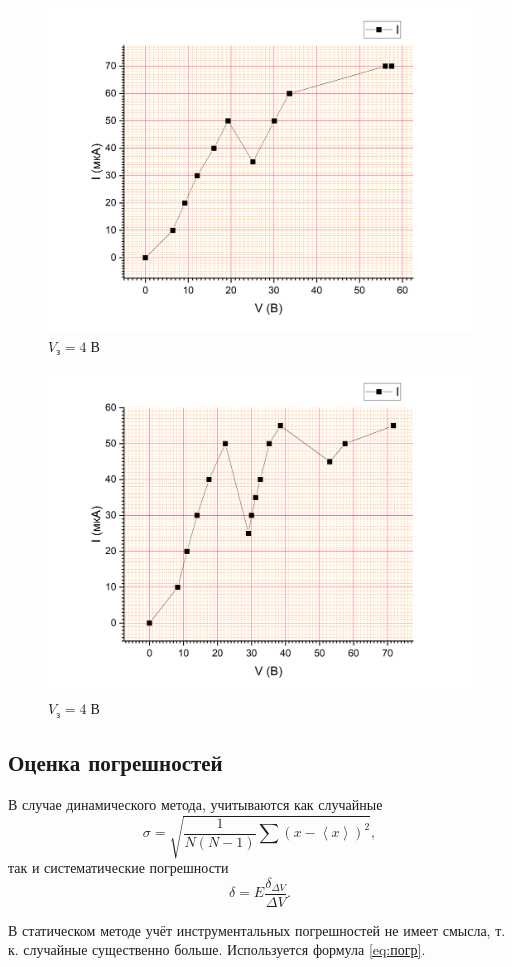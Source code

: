 \documentclass[a4paper]{article}
\begin{document}
\begin{figure}[tbh]
	\centering
	\includegraphics[width=0.7\linewidth]{Graph2}
	\caption{$V_з = 4 \;В$}
	\label{fig:graph2}
\end{figure}

\begin{figure}[tbh]
	\centering
	\includegraphics[width=0.7\linewidth]{Graph3}
	\caption{$V_з = 4 \;В$}
	\label{fig:graph3}
\end{figure}


\subsection{Оценка погрешностей}

В случае динамического метода, учитываются как случайные 
\begin{equation}\label{eq:погр}
	 \sigma = \sqrt{\frac{1}{N(N-1)}\sum (x-\left\langle x\right\rangle )^2},
\end{equation} 
так и систематические  погрешности $$ \delta = E \frac{\delta_{\Delta V}}{\Delta V}. $$

В статическом методе учёт инструментальных погрешностей не имеет смысла, т. к. случайные существенно больше. Используется формула \eqref{eq:погр}.
\end{document}
